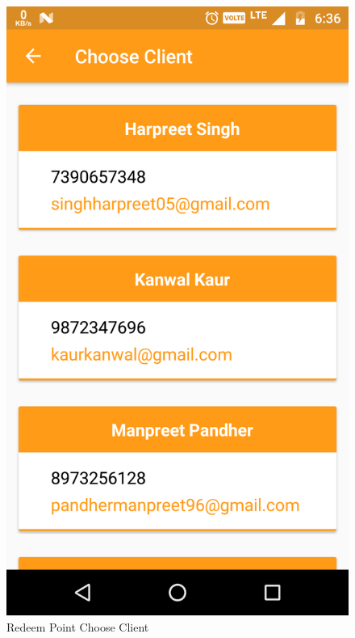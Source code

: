 \\
\begin{figure}[h]
	\centering
	\includegraphics[width=0.7\linewidth]{RedeemPointChooseClient}
	\caption{Redeem Point Choose Client}
\end{figure}
\pagebreak

